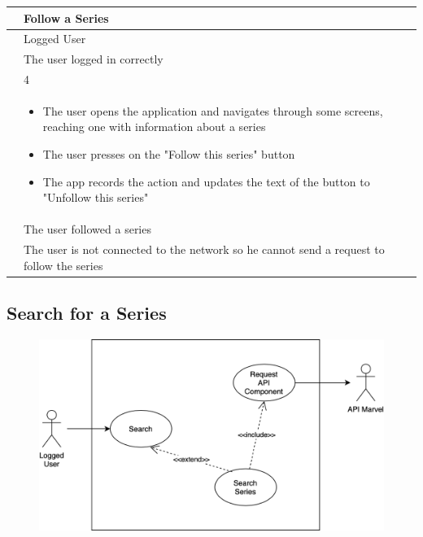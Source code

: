 {{{{{{{{\renewcommand{\arraystretch}{2}
{\begin{center}
\begin{tabular}{ | m{4cm} | m{9cm} | } 
 \hline
 {\centering{\textbf{Name}}} & Follow a Series \\
 \hline
 {\centering{\textbf{Actor}}} & Logged User \\
 \hline
 {\centering{\textbf{Entry Condition}}} & The user logged in correctly \\
 \hline
 {\centering{\textbf{Goal}}} & 4 \\
 \hline
 {\centering{\textbf{Event flow}}} & \begin{itemize}[leftmargin=*]
 	\item The user opens the application and navigates through some screens, reaching one with information about a series
	\item The user presses on the "Follow this series" button 
	\item The app records the action and updates the text of the button to "Unfollow this series"
	\end{itemize} \\	
 \hline
 {\centering{\textbf{Exit condition}}} & The user followed a series \\
 \hline
 {\centering{\textbf{Exceptions}}} & The user is not connected to the network so he cannot send a request to follow the series \\
 \hline
\end{tabular}
\end{center}}


\clearpage

\subsection{Search for a Series}
\begin{figure}[h]
\centering
\includegraphics[width=\textwidth]{img/usecases/search}
\end{figure}

}}}}}}}}
